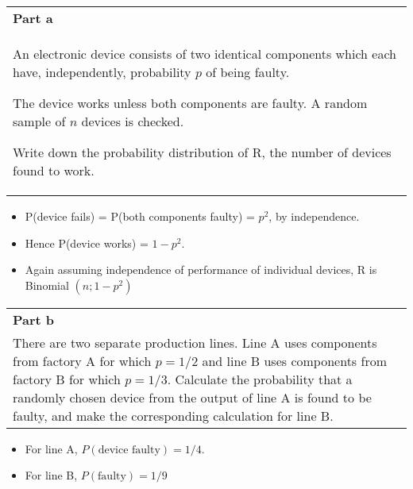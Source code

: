 \documentclass[a4paper,12pt]{article}
\begin{document}
\large

  \begin{table}[ht!]
     \centering
     \begin{tabular}{|p{15cm}|}
     \hline
     \large
     \smallskip
\noindent \textbf{Part a} \\ \large
An electronic device consists of two identical components which each have, independently, probability $p$ of being faulty.  


The device works unless both components are faulty.  A random sample of $n$ devices is checked. 

 
Write down the probability distribution of R, the number of devices found to work. \\
 \hline
      \end{tabular}
    \end{table}
    
    

\begin{itemize}
    \item P(device fails) = P(both components faulty) = $p^2$, by independence.
    

    \item Hence P(device works) =
$1-p^2$. 
\item Again assuming independence of performance of individual devices, R is Binomial
$(n; 1 - p^2)$
\end{itemize}

\newpage
  \begin{table}[ht!]
     \centering
     \begin{tabular}{|p{15cm}|}
     \hline
 \smallskip      \large
\noindent \textbf{Part b} \\
\large
There are two separate production lines.  Line A uses components from factory A for which $p = 1/2$ and line B uses components from factory B for which $p = 1/3$.  Calculate the probability that a randomly chosen device from the output of line A is found to be faulty, and make the corresponding calculation for line B. \\
 \hline
      \end{tabular}
    \end{table}
    
\begin{itemize}
\item For line A, $P(\mbox{device faulty}) = 1/4$.
\item For line B, $P(\mbox{faulty}) = 1/9$
\end{itemize}
\end{document}
